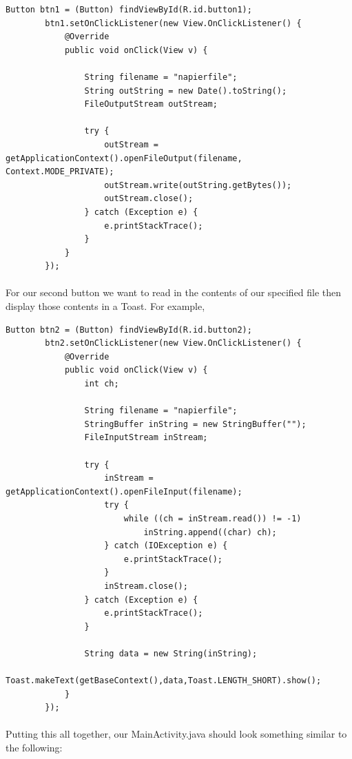 \begin{lstlisting}
Button btn1 = (Button) findViewById(R.id.button1);
        btn1.setOnClickListener(new View.OnClickListener() {
            @Override
            public void onClick(View v) {

                String filename = "napierfile";
                String outString = new Date().toString();
                FileOutputStream outStream;

                try {
                    outStream = getApplicationContext().openFileOutput(filename, Context.MODE_PRIVATE);
                    outStream.write(outString.getBytes());
                    outStream.close();
                } catch (Exception e) {
                    e.printStackTrace();
                }
            }
        });
\end{lstlisting}

\paragraph{} For our second button we want to read in the contents of our specified file then display those contents in a Toast. For example,

\begin{lstlisting}
Button btn2 = (Button) findViewById(R.id.button2);
        btn2.setOnClickListener(new View.OnClickListener() {
            @Override
            public void onClick(View v) {
                int ch;

                String filename = "napierfile";
                StringBuffer inString = new StringBuffer("");
                FileInputStream inStream;

                try {
                    inStream = getApplicationContext().openFileInput(filename);
                    try {
                        while ((ch = inStream.read()) != -1)
                            inString.append((char) ch);
                    } catch (IOException e) {
                        e.printStackTrace();
                    }
                    inStream.close();
                } catch (Exception e) {
                    e.printStackTrace();
                }

                String data = new String(inString);
                Toast.makeText(getBaseContext(),data,Toast.LENGTH_SHORT).show();
            }
        });
\end{lstlisting}

\paragraph{} Putting this all together, our MainActivity.java should look something similar to the following:

